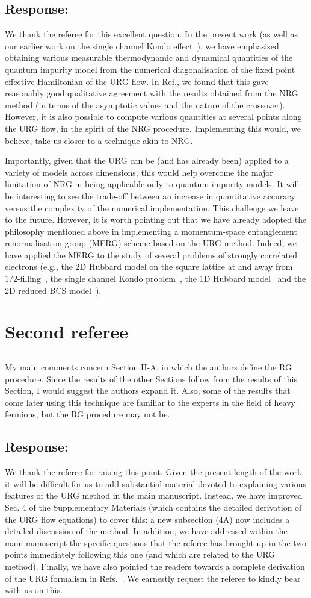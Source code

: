 \documentclass{article}
\newcommand{\response}[1]{{\color{blue}\subsection*{Response:}{#1}}}
\newcommand{\point}[1]{\subsection{}{#1}}
\begin{document}
\response{We thank the referee for this excellent question. In the present work (as well as our earlier work on the single channel Kondo effect~\cite{kondo_urg}), we have emphasised obtaining various measurable thermodynamic and dynamical quantities of the quantum impurity model from the numerical diagonalisation of the fixed point effective Hamiltonian of the URG flow. In Ref.\cite{kondo_urg}, we found that this gave reasonably good qualitative agreement with the results obtained from the NRG method (in terms of the asymptotic values and the nature of the crossover). However, it is also possible to compute various quantities at several points along the URG flow, in the spirit of the NRG procedure. Implementing this would, we believe, take us closer to a technique akin to NRG. 
\par\noindent
Importantly, given that the URG can be (and has already been) applied to a variety of models across dimensions, this would help overcome the major limitation of NRG in being applicable only to quantum impurity models. It will be interesting to see the trade-off between an increase in quantitative accuracy versus the complexity of the numerical implementation. This challenge we leave to the future. However, it is worth pointing out that we have already adopted the philosophy mentioned above in implementing a momentum-space entanglement renormalisation group (MERG) scheme based on the URG method. Indeed, we have applied the MERG to the study of several problems of strongly correlated electrons (e.g., the 2D Hubbard model on the square lattice at and away from $1/2$-filling~\cite{mukherjeeMERG2022}, the single channel Kondo problem~\cite{kondo_urg}, the 1D Hubbard model~\cite{1dhubjhep} and the 2D reduced BCS model~\cite{siddharthacpi}).}

\section{Second referee}

\point{
My main comments concern Section II-A, in which the authors define the RG procedure. Since the results of the other Sections follow from the results of this Section, I would suggest the authors expand it. Also, some of the results that come later using this technique are familiar to the experts in the field of heavy fermions, but the RG procedure may not be.}

\response{We thank the referee for raising this point. Given the present length of the work, it will be difficult for us to add substantial material devoted to explaining various features of the URG method in the main manuscript. Instead, we have improved Sec. 4 of the Supplementary Materials (which contains the detailed derivation of the URG flow equations) to cover this: a new subsection (4A) now includes a detailed discussion of the method. In addition, we have addressed within the main manuscript the specific questions that the referee has brought up in the two points immediately following this one (and which are related to the URG method). Finally, we have also pointed the readers towards a complete derivation of the URG formalism in Refs.~\cite{anirbanurg1,anirbanurg2}. We earnestly request the referee to kindly bear with us on this.}
\end{document}
